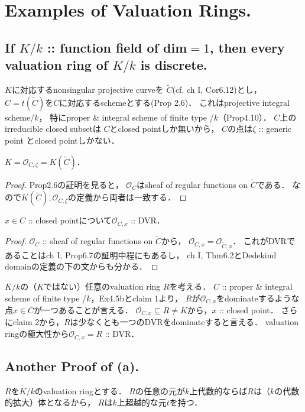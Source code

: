 \documentclass[a4paper]{jsarticle}
\newcommand{\shO}{\mathcal{O}}
\begin{document}
\section{Examples of Valuation Rings.} %
    \subsection{If $K/k$ :: function field of dim$=1$, then every valuation ring of $K/k$ is discrete.}
    $K$に対応するnonsingular projective curveを
    $\tilde{C}$(cf. ch I, Cor6.12)とし，
    $C=t(\tilde{C})$を$C$に対応するschemeとする(Prop 2.6)．
    これはprojective integral scheme/$k$，
    特にproper \& integral scheme of finite type /$k$（Prop4.10）．
    $C$上のirreducible closed subsetは
    $C$とclosed pointしか無いから，
    $C$の点は$\zeta$ :: generic point とclosed pointしかない．

    \begin{Claim}[claim 1]
        $K=\shO_{C,\zeta}=K(\tilde{C})$．
    \end{Claim}
    \begin{proof}
        Prop2.6の証明を見ると，
        $\shO_C$はsheaf of regular functions on $\tilde{C}$である．
        なので$K(\tilde{C}), \shO_{C,\zeta}$の定義から両者は一致する．
    \end{proof}

    \begin{Claim}[claim 2]
        $x \in C$ :: closed pointについて$\shO_{C,x}$ :: DVR．
    \end{Claim}
    \begin{proof}
        $\shO_C$ :: sheaf of regular functions on $\tilde{C}$から，
        $\shO_{C,x}=\shO_{\tilde{C},x}$．
        これがDVRであることはch I, Prop6.7の証明中程にもあるし，
        ch I, Thm6.2とDedekind domainの定義の下の文からも分かる．
    \end{proof}

    $K/k$の（$K$ではない）任意のvaluation ring $R$を考える．
    $C$ :: proper \& integral scheme of finite type /$k$，Ex4.5bとclaim 1より，
    $R$が$\shO_{C,x}$をdominateするような点$x \in C$が一つあることが言える．
    $\shO_{C,x} \subseteq R \neq K$から，$x$ :: closed point．
    さらにclaim 2から，$R$は少なくとも一つのDVRをdominateすると言える．
    valuation ringの極大性から$\shO_{C,x}=R$ :: DVR．

    \subsection*{Another Proof of (a).}
    $R$を$K/k$のvaluation ringとする．
    $R$の任意の元が$k$上代数的ならば$R$は（$k$の代数的拡大）体となるから，
    $R$は$k$上超越的な元$t$を持つ．
\end{document}
